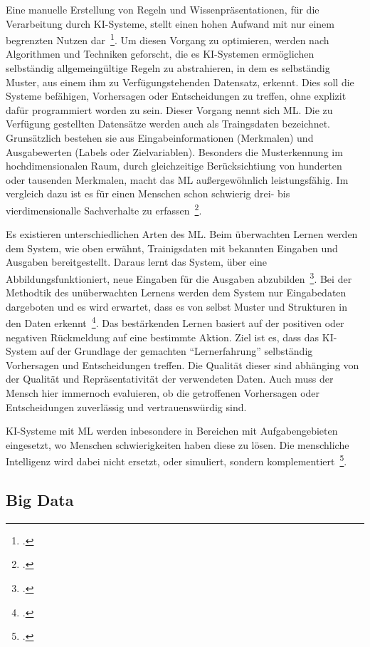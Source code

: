 Eine manuelle Erstellung von Regeln und Wissenpräsentationen, für die Verarbeitung durch \ac{KI}-Systeme, stellt einen hohen Aufwand mit nur einem begrenzten Nutzen dar~\footcite[\vglf][]{Matzka.2021}.
Um diesen Vorgang zu optimieren, werden nach Algorithmen und Techniken geforscht, die es \ac{KI}-Systemen ermöglichen selbständig allgemeingültige Regeln zu abstrahieren, in dem es selbständig Muster, aus einem ihm zu Verfügungstehenden
Datensatz, erkennt. Dies soll die Systeme befähigen, Vorhersagen oder Entscheidungen zu treffen, ohne explizit dafür programmiert worden zu sein. Dieser Vorgang nennt sich \ac{ML}.
Die zu Verfügung gestellten Datensätze werden auch als Traingsdaten bezeichnet. Grunsätzlich bestehen sie aus Eingabeinformationen (Merkmalen) und Ausgabewerten (Labels oder Zielvariablen).
Besonders die Musterkennung im hochdimensionalen Raum, durch gleichzeitige Berücksichtiung von hunderten oder tausenden Merkmalen, macht das \ac{ML} außergewöhnlich leistungsfähig. Im vergleich dazu ist es für einen Menschen
schon schwierig drei- bis vierdimensionalle Sachverhalte zu erfassen~\footcite[\vglf][]{Matzka.2021}.

Es existieren unterschiedlichen Arten des \ac{ML}. Beim überwachten Lernen werden dem System, wie oben erwähnt, Trainigsdaten mit bekannten Eingaben und Ausgaben bereitgestellt. Daraus lernt 
das System, über eine Abbildungsfunktioniert, neue Eingaben für die Ausgaben abzubilden~\footcite[\vglf][]{Plaue.2021}. Bei der Methodtik des unüberwachten Lernens werden dem System nur Eingabedaten dargeboten und es wird erwartet,
dass es von selbst Muster und Strukturen in den Daten erkennt~\footcite[\vglf][]{Plaue.2021}. 
Das bestärkenden Lernen basiert auf der positiven oder negativen Rückmeldung auf eine bestimmte Aktion. 
Ziel ist es, dass das \ac{KI}-System auf der Grundlage der gemachten \enquote{Lernerfahrung} selbständig Vorhersagen und Entscheidungen treffen. 
Die Qualität dieser sind abhänging von der Qualität und Repräsentativität der verwendeten Daten. Auch muss der Mensch hier immernoch evaluieren, ob die getroffenen Vorhersagen oder Entscheidungen
zuverlässig und vertrauenswürdig sind.

\ac{KI}-Systeme mit \ac{ML} werden inbesondere in Bereichen mit Aufgabengebieten eingesetzt, wo Menschen schwierigkeiten haben diese zu lösen. Die menschliche Intelligenz wird dabei nicht ersetzt,
oder simuliert, sondern komplementiert~\footcite[\vglf][]{Matzka.2021}.


\subsection{Big Data}

